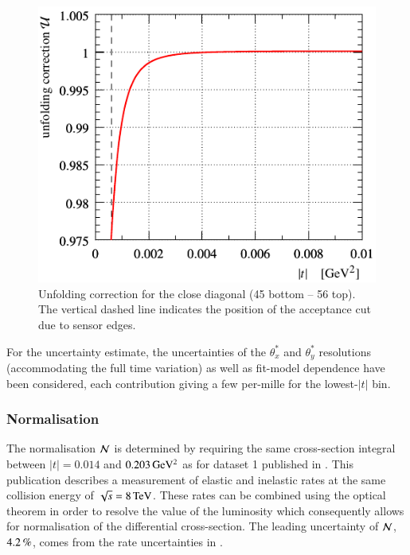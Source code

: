 \begin{figure}
\begin{center}
\includegraphics{fig/unfolding.pdf}
\caption{%
Unfolding correction for the close diagonal (45 bottom -- 56 top). The vertical dashed line indicates the position of the acceptance cut due to sensor edges.
}
\label{fig:unfolding}
\end{center}
\end{figure}

For the uncertainty estimate, the uncertainties of the $\theta_x^*$ and $\theta_y^*$ resolutions (accommodating the full time variation) as well as fit-model dependence have been considered, each contribution giving a few per-mille for the lowest-$|t|$ bin.


\subsubsection{Normalisation}
\label{sec:normalisation}

The normalisation ${\cal N}$ is determined by requiring the same cross-section integral between $|t| = 0.014$ and $0.203\,{\rm GeV^2}$ as for dataset 1 published in \cite{prl111}. This publication describes a measurement of elastic and inelastic rates at the same collision energy of $\sqrt s = 8\,{\rm TeV}$. These rates can be combined using the optical theorem in order to resolve the value of the luminosity which consequently allows for normalisation of the differential cross-section. The leading uncertainty of ${\cal N}$, $4.2\,{\rm \%}$, comes from the rate uncertainties in \cite{prl111}.



